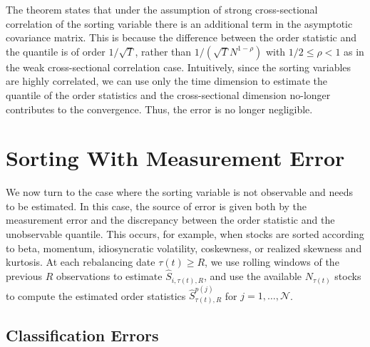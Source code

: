 \noindent
The theorem states that under the assumption of strong cross-sectional correlation of the sorting variable there is an additional term in the asymptotic covariance matrix. This is because the difference between the order statistic and the quantile is of order $1/\sqrt{T}$, rather than $1/(\sqrt{ {T}}N^{1-\rho })$ with $1/2\leq \rho <1$ as in the weak cross-sectional correlation case. Intuitively, since the sorting variables are highly correlated, we can use only the time dimension to estimate the quantile of the order statistics and the cross-sectional dimension no-longer contributes to the convergence. Thus, the error is no longer negligible.




\section{Sorting With Measurement Error}
\label{Sorting With Measurement Error}

We now turn to the case where the sorting variable is not observable and needs to be estimated. In this case, the source of error is given both by the measurement error and the discrepancy between the order statistic and the unobservable quantile. This occurs, for example, when stocks are sorted according to beta, momentum, idiosyncratic volatility, coskewness, or realized skewness and kurtosis. At each rebalancing date $\tau(t) \geq R$, we use rolling windows of the previous $R$ observations to estimate $\widehat{S}_{i,\tau(t),R}$, and use the available $N_{\tau(t)}$ stocks to compute the estimated order statistics $\widehat{S}_{\tau(t),R}^{p(j)}$ for $j=1,\ldots, \mathcal{N}$.

\subsection{Classification Errors}

